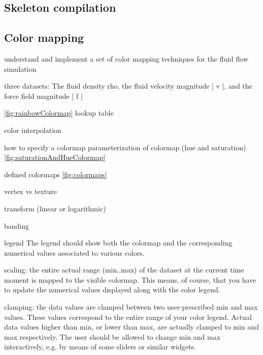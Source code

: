 \subsection{Skeleton compilation}
\subsection{Color mapping}


understand and implement a set of color mapping techniques for the fluid flow simulation

three datasets: The fluid density rho, the fluid velocity magnitude | v |, and the force field magnitude | f |

\ref{fig:rainbowColormap}
lookup table

color interpolation

how to specify a colormap
parameterization of colormap (hue and saturation) \ref{fig:saturationAndHueColormap}

defined colormaps \ref{fig:colormaps}
 
vertex vs texture

transform (linear or logarithmic)



banding 

legend  The legend should show both the colormap and the corresponding numerical values associated to various colors.


scaling: the entire actual range (min..max) of the dataset at the current time moment is mapped to the visible colormap. This means, of course, that you have to update the numerical values displayed along with the color legend.

clamping: the data values are clamped between two user-prescribed min and max values. These values correspond to the entire range of your color legend. Actual data values higher than min, or lower than max, are actually clamped to min and max respectively. The user should be allowed to change min and max interactively, e.g. by means of some sliders or similar widgets.
 
